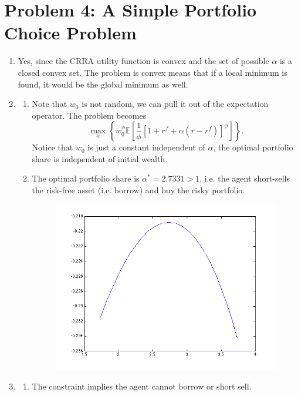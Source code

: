 \section{Problem 4: A Simple Portfolio Choice Problem}
\begin{enumerate}
\item 
Yes, since the CRRA utility function is convex and the set of possible $\alpha$ is a closed convex set. The problem is convex means that if a local minimum is found, it would be the global minimum as well.

\item
\begin{enumerate}
\item 
Note that $w_0$ is not random, we can pull it out of the expectation operator. The problem becomes
\begin{equation*}
	\max_\alpha\left\{w_0^\phi\mathbb E\left[\frac{1}{\phi}[1+r^f+\alpha(r-r^f)]^\phi\right]\right\}.
\end{equation*}
Notice that $w_0$ is just a constant independent of $\alpha$, the optimal portfolio share is independent of initial wealth.

\item
The optimal portfolio share is $\alpha^*=2.7331>1$, i.e. the agent short-sells the risk-free asset (i.e. borrow) and buy the risky portfolio. 
\begin{center}
\begin{figure}[htbp]
\begin{center}
	\includegraphics[width=10cm]{Figure/Q4_2b.png}
\end{center}
\end{figure}
\end{center}
\end{enumerate}

\item
\begin{enumerate}
\item
The constraint implies the agent cannot borrow or short sell.


\end{enumerate}
\end{enumerate}
